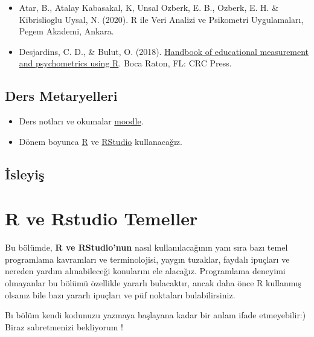 \documentclass[
  oneside]{book}
\begin{document}
\begin{itemize}
\item
  Atar, B., Atalay Kabasakal, K, Unsal Ozberk, E. B., Ozberk, E. H. \& Kibrislioglu Uysal, N. (2020). R ile Veri Analizi ve Psikometri Uygulamaları, Pegem Akademi, Ankara.
\item
  Desjardins, C. D., \& Bulut, O. (2018). \href{https://www.routledge.com/Handbook-of-Educational-Measurement-and-Psychometrics-Using-R/Desjardins-Bulut/p/book/9780367734671}{Handbook of educational measurement and psychometrics using R}. Boca Raton, FL: CRC Press.
\end{itemize}

\hypertarget{ders-metaryelleri}{%
\section*{Ders Metaryelleri}\label{ders-metaryelleri}}

\begin{itemize}
\item
  Ders notları ve okumalar \href{https://lisansustu.hacettepe.edu.tr/login/index.php}{moodle}.
\item
  Dönem boyunca \href{https://cran.r-project.org/}{R} ve \href{https://www.rstudio.com/}{RStudio} kullanacağız.
\end{itemize}

\hypertarget{isleyiux15f}{%
\section*{İsleyiş}\label{isleyiux15f}}

\hypertarget{r-ve-rstudio-temeller}{%
\chapter{R ve Rstudio Temeller}\label{r-ve-rstudio-temeller}}

Bu bölümde, \textbf{R ve RStudio'nun} nasıl kullanılacağının yanı sıra bazı temel programlama kavramları ve terminolojisi, yaygın tuzaklar, faydalı ipuçları ve nereden yardım alınabileceği konularını ele alacağız. Programlama deneyimi olmayanlar bu bölümü özellikle yararlı bulacaktır, ancak daha önce R kullanmış olsanız bile bazı yararlı ipuçları ve püf noktaları bulabilirsiniz.

Bı bölüm kendi kodunuzu yazmaya başlayana kadar bir anlam ifade etmeyebilir:) Biraz sabretmenizi bekliyorum !
\end{document}
